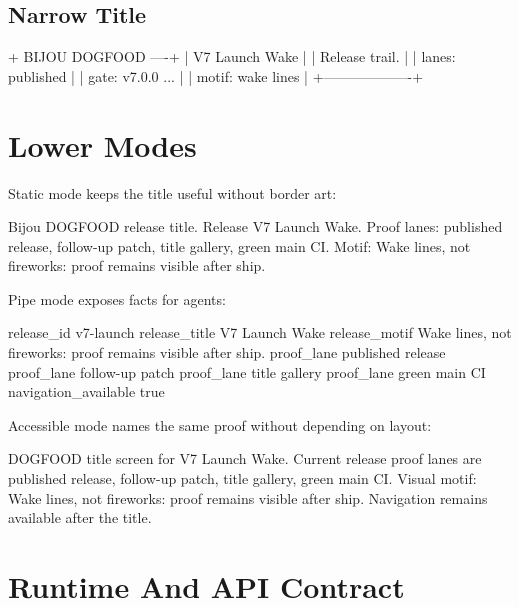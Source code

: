 \subsection{Narrow Title}\label{record-112-narrow-title}

\begin{CodeBlock}
+ BIJOU DOGFOOD ----+
| V7 Launch Wake    |
| Release trail.    |
| lanes: published  |
| gate: v7.0.0 ...  |
| motif: wake lines |
+-------------------+
\end{CodeBlock}

\section{Lower Modes}\label{record-112-lower-modes}

Static mode keeps the title useful without border art:

\begin{CodeBlock}
Bijou DOGFOOD release title. Release V7 Launch Wake.
Proof lanes: published release, follow-up patch, title gallery, green main CI.
Motif: Wake lines, not fireworks: proof remains visible after ship.
\end{CodeBlock}

Pipe mode exposes facts for agents:

\begin{CodeBlock}
release_id  v7-launch
release_title   V7 Launch Wake
release_motif   Wake lines, not fireworks: proof remains visible after ship.
proof_lane  published release
proof_lane  follow-up patch
proof_lane  title gallery
proof_lane  green main CI
navigation_available    true
\end{CodeBlock}

Accessible mode names the same proof without depending on layout:

\begin{CodeBlock}
DOGFOOD title screen for V7 Launch Wake.
Current release proof lanes are published release, follow-up patch,
title gallery, green main CI.
Visual motif: Wake lines, not fireworks: proof remains visible after ship.
Navigation remains available after the title.
\end{CodeBlock}

\section{Runtime And API Contract}\label{record-112-runtime-and-api-contract}

